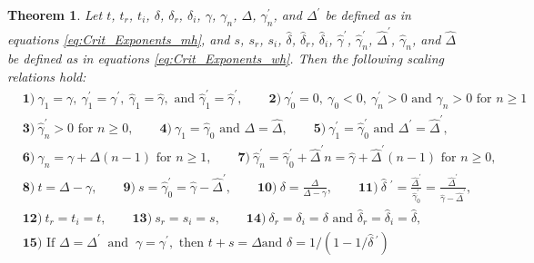 \documentclass[english,12pt,jmp,graphicx]{revtex4-1}
\newtheorem{theorem}{Theorem}[section]
\newcommand{\gh}{\hat{\gamma}}
\newcommand{\Dh}{\hat{\Delta}}
\newcommand{\dha}{\hat{\delta}}
\begin{document}
\begin{theorem} \label{thm:Crit_Theory_m_w}
  Let $t$, $t_r$, $t_i$, $\delta$, $\delta_r$, $\delta_i$, $\gamma$, $\gamma_n$, $\Delta$, $\gamma_n^\prime$,
  and $\Delta^\prime$ be   defined as in equations \eqref{eq:Crit_Exponents_mh},
  and $s$, $s_r$, $s_i$, $\dha$, $\dha_r$, $\dha_i$, $\gh^\prime$, $\gh_n^\prime$,
  $\Dh^\prime$, $\gh_n$, and $\Dh$ be defined as in equations
  \eqref{eq:Crit_Exponents_wh}. Then the following scaling relations
  hold:
%  
  \begin{align*}   
   &\mathbf{1)} \ \gamma_1=\gamma, \ \gamma_1^\prime=\gamma^\prime, \ \gh_1=\gh, \text{ and } \gh_1^\prime=\gh^\prime, \qquad
     \mathbf{2)} \ \gamma_0^\prime=0, \ \gamma_0<0, \ \gamma_n^\prime>0 \text{ and } \gamma_n>0 \text{ for } n\geq1\\
   &\mathbf{3)} \ \gh_n^\prime>0 \text{ for } n\geq0, \qquad
   \mathbf{4)} \ \gamma_1=\gh_0 \text{ and } \Delta=\Dh, \qquad
   \mathbf{5)} \ \gamma_1^\prime=\gh_0^\prime \text{ and } \Delta^\prime=\Dh^\prime, \\
   &\mathbf{6)} \ \gamma_n=\gamma+\Delta(n-1) \text{ for } n\geq1, \qquad
   \mathbf{7)} \ \gh_n^\prime=\gh_0^\prime+\Dh^\prime n=\gh+\Dh^\prime(n-1) \text{ for } n\geq0, \\
   &\mathbf{8)} \ t=\Delta-\gamma, \qquad 
   \mathbf{9)} \ s=\gh_0^\prime=\gh-\Dh^\prime, \qquad
   \mathbf{10)} \ \delta=\frac{\Delta}{\Delta-\gamma}, \qquad
   \mathbf{11)} \ \dha\;^\prime=\frac{\Dh^\prime}{\gh_0^\prime}=\frac{\Dh^\prime}{\gh-\Dh^\prime}, \\
   &\mathbf{12)} \ t_r=t_i=t, \qquad
   \mathbf{13)} \ s_r=s_i=s, \qquad
   \mathbf{14)} \ \delta_r=\delta_i=\delta \text{ and } \dha_r=\dha_i=\dha, \\
   &\mathbf{15)} \text{ If } \Delta=\Delta^\prime \ \text{ and } \ \gamma=\gamma^\prime, \text{ then } t+s=\Delta \text{
     and }  \delta=1/(1-1/\dha\,^\prime)
  \end{align*}
%  
\end{theorem}
%
\end{document}
